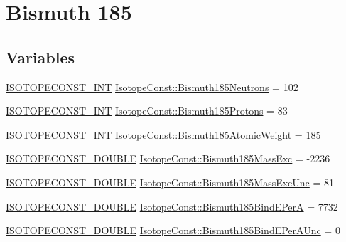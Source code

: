 \hypertarget{group___isotope_const-_bismuth-_bi185}{}\section{Bismuth 185}
\label{group___isotope_const-_bismuth-_bi185}
\subsection*{Variables}
\begin{DoxyCompactItemize}
\item 
\mbox{\hyperlink{group___isotope_const-_macros_ga5f18360b3e99483a35c32d789e62621c}{I\+S\+O\+T\+O\+P\+E\+C\+O\+N\+S\+T\+\_\+\+I\+NT}} \mbox{\hyperlink{group___isotope_const-_bismuth-_bi185_gafb87d93d85622a6511cb7d0d9c426f24}{Isotope\+Const\+::\+Bismuth185\+Neutrons}} = 102
\item 
\mbox{\hyperlink{group___isotope_const-_macros_ga5f18360b3e99483a35c32d789e62621c}{I\+S\+O\+T\+O\+P\+E\+C\+O\+N\+S\+T\+\_\+\+I\+NT}} \mbox{\hyperlink{group___isotope_const-_bismuth-_bi185_ga106c7680cdf940693defac6b24748f87}{Isotope\+Const\+::\+Bismuth185\+Protons}} = 83
\item 
\mbox{\hyperlink{group___isotope_const-_macros_ga5f18360b3e99483a35c32d789e62621c}{I\+S\+O\+T\+O\+P\+E\+C\+O\+N\+S\+T\+\_\+\+I\+NT}} \mbox{\hyperlink{group___isotope_const-_bismuth-_bi185_gaf7902eb77c7c5920ceb93648a4012c66}{Isotope\+Const\+::\+Bismuth185\+Atomic\+Weight}} = 185
\item 
\mbox{\hyperlink{group___isotope_const-_macros_ga8f45a7272ce02c0b4c65c44636ed719a}{I\+S\+O\+T\+O\+P\+E\+C\+O\+N\+S\+T\+\_\+\+D\+O\+U\+B\+LE}} \mbox{\hyperlink{group___isotope_const-_bismuth-_bi185_gac4607fa7d2f3619250054caa5e82ab34}{Isotope\+Const\+::\+Bismuth185\+Mass\+Exc}} = -\/2236
\item 
\mbox{\hyperlink{group___isotope_const-_macros_ga8f45a7272ce02c0b4c65c44636ed719a}{I\+S\+O\+T\+O\+P\+E\+C\+O\+N\+S\+T\+\_\+\+D\+O\+U\+B\+LE}} \mbox{\hyperlink{group___isotope_const-_bismuth-_bi185_ga45150b0da3d25227f50535536f3755d3}{Isotope\+Const\+::\+Bismuth185\+Mass\+Exc\+Unc}} = 81
\item 
\mbox{\hyperlink{group___isotope_const-_macros_ga8f45a7272ce02c0b4c65c44636ed719a}{I\+S\+O\+T\+O\+P\+E\+C\+O\+N\+S\+T\+\_\+\+D\+O\+U\+B\+LE}} \mbox{\hyperlink{group___isotope_const-_bismuth-_bi185_gae988b9a2e6cd505c5522c75ff42fff62}{Isotope\+Const\+::\+Bismuth185\+Bind\+E\+PerA}} = 7732
\item 
\mbox{\hyperlink{group___isotope_const-_macros_ga8f45a7272ce02c0b4c65c44636ed719a}{I\+S\+O\+T\+O\+P\+E\+C\+O\+N\+S\+T\+\_\+\+D\+O\+U\+B\+LE}} \mbox{\hyperlink{group___isotope_const-_bismuth-_bi185_gafd89aa6581e34772fd783df33ba6f175}{Isotope\+Const\+::\+Bismuth185\+Bind\+E\+Per\+A\+Unc}} = 0

\end{DoxyCompactItemize}
